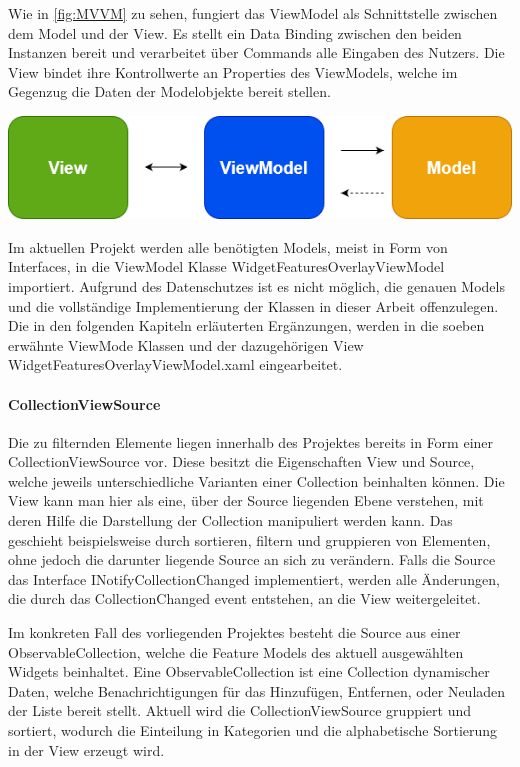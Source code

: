 Wie in \cref{fig:MVVM} zu sehen, fungiert das ViewModel als Schnittstelle zwischen dem Model und der View. Es stellt ein Data Binding zwischen den beiden Instanzen bereit und verarbeitet über Commands alle Eingaben des Nutzers.
Die View bindet ihre Kontrollwerte an Properties des ViewModels, welche im Gegenzug die Daten der Modelobjekte bereit stellen.

\newpage
\begin{center}
  \includegraphics[scale=0.6]{figures/MVVM.PNG}
  \label{fig:MVVM}
\end{center}

Im aktuellen Projekt werden alle benötigten Models, meist in Form von Interfaces, in die ViewModel Klasse WidgetFeaturesOverlayViewModel importiert.
Aufgrund des Datenschutzes ist es nicht möglich, die genauen Models und die vollständige Implementierung der Klassen in dieser Arbeit offenzulegen.
Die in den folgenden Kapiteln erläuterten Ergänzungen, werden in die soeben erwähnte ViewMode Klassen und der dazugehörigen View WidgetFeaturesOverlayViewModel.xaml eingearbeitet.

\paragraph{CollectionViewSource}
Die zu filternden Elemente liegen innerhalb des Projektes bereits in Form einer CollectionViewSource vor.
Diese besitzt die Eigenschaften View und Source, welche jeweils unterschiedliche Varianten einer Collection beinhalten können.
Die View kann man hier als eine, über der Source liegenden Ebene verstehen, mit deren Hilfe die Darstellung der Collection manipuliert werden kann.
Das geschieht beispielsweise durch sortieren, filtern und gruppieren von Elementen, ohne jedoch die darunter liegende Source an sich zu verändern.
Falls die Source das Interface INotifyCollectionChanged implementiert, werden alle Änderungen, die durch das CollectionChanged event entstehen, an die View weitergeleitet.\cite{dotnetbot.}

Im konkreten Fall des vorliegenden Projektes besteht die Source aus einer ObservableCollection, welche die Feature Models des aktuell ausgewählten Widgets beinhaltet.
Eine ObservableCollection ist eine Collection dynamischer Daten, welche Benachrichtigungen für das Hinzufügen, Entfernen, oder Neuladen der Liste bereit stellt.
\cite{dotnetbot.c}
Aktuell wird die CollectionViewSource gruppiert und sortiert, wodurch die Einteilung in Kategorien und die alphabetische Sortierung in der View erzeugt wird.

